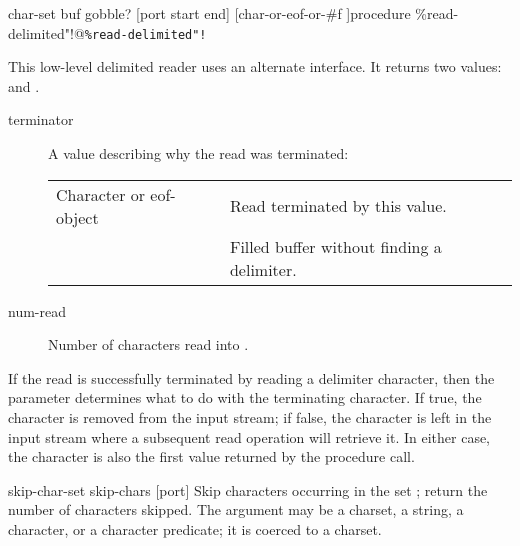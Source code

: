  {char-set buf gobble? [port start end]} 
        {[char-or-eof-or-\#f \integer]}{procedure}
        {\%read-delimited"!@\texttt{\%read-delimited"!}}
\begin{desc}
This low-level delimited reader uses an alternate interface.
It returns two values:  and .
\begin{description}
\item [terminator]
        A value describing why the read was terminated:
        \begin{flushleft}
        \begin{tabular}{l@{\qquad$\Rightarrow$\qquad}l}
        Character or eof-object & Read terminated by this value. \\
        \ex{\#f}                & Filled buffer without finding a delimiter.
        \end{tabular}
        \end{flushleft}

\item [num-read]
        Number of characters read into .
\end{description}

If the read is successfully terminated by reading a delimiter character,
then the  parameter determines what to do with the terminating
character.
If true, the character is removed from the input stream;
if false, the character is left in the input stream where a subsequent
read operation will retrieve it.
In either case, the character is also the first value returned by
the procedure call.
\end{desc}


\begin{defundesc} {skip-char-set} {skip-chars [port]} {\integer}
    Skip characters occurring in the set ;
    return the number of characters skipped.
    The  argument may be a charset, a string, a character, or a
    character predicate; it is coerced to a charset.
\end{defundesc}

